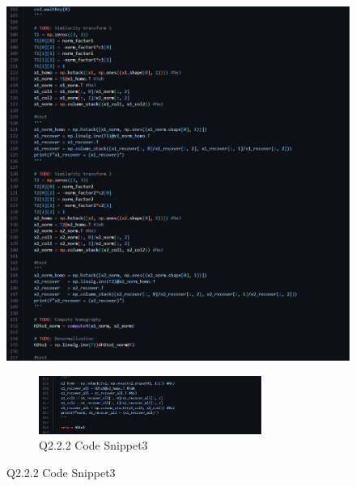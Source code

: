 \documentclass{article}
\begin{document}
\begin{figure}[H]
\begin{minipage}[b]{0.45\textwidth}
		\includegraphics[width=\textwidth]{Q2_2_2_cns2.png}  %
		\caption{Q2.2.2. Code Snippet 2}
		\label{fig:Q222_csn2}
	\end{minipage}
	\begin{figure}[H]		
		\centering
		\includegraphics[width=0.8\textwidth]{Q2_2_2_cns3.png}  %
		\caption{Q2.2.2 Code Snippet3}
		\label{fig:Q222_cns3}
	\end{figure}	
	\end{figure}
	
	\newpage
\end{document}
